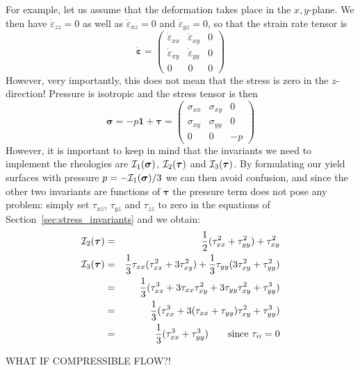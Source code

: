 For example, let us assume that the deformation takes place in the $x,y$-plane. 
We then have $\dot{\varepsilon}_{zz}=0$ as well as $\dot{\varepsilon}_{xz}=0$ and $\dot{\varepsilon}_{yz}=0$, so
that the strain rate tensor is 
\[
\dot{\bm \varepsilon}=
\left( \begin{array}{ccc}
\dot{\varepsilon}_{xx} & \dot{\varepsilon}_{xy} & 0 \\
\dot{\varepsilon}_{xy} & \dot{\varepsilon}_{yy} & 0 \\
0 & 0 & 0
\end{array}\right)
\]
However, very importantly, this does not mean that the stress is zero in the $z$-direction! Pressure is 
isotropic and the stress tensor is then 
\[
{\bm \sigma}=
-p {\bm 1} + {\bm \tau} =
\left( \begin{array}{ccc}
{\sigma}_{xx} & {\sigma}_{xy} & 0 \\
{\sigma}_{xy} & {\sigma}_{yy} & 0 \\
0 & 0 & -p
\end{array}\right)
\]
However, it is important to keep in mind that the invariants we need to implement 
the rheologies are ${\cal I}_1({\bm \sigma})$,  ${\cal I}_2({\bm \tau})$ and ${\cal I}_3({\bm \tau})$.
By formulating our yield surfaces with pressure $p=-{\cal I}_1({\bm \sigma})/3$ we can then 
avoid confusion, and since the other two invariants are functions of ${\bm \tau}$ the pressure 
term does not pose any problem: simply set $\tau_{xz}$, $\tau_{yz}$ and $\tau_{zz}$ to zero in the 
equations of Section~\ref{sec:stress_invariants} and we obtain:
\begin{eqnarray}
{\cal I}_2({\bm \tau}) &=&\frac{1}{2}(\tau_{xx}^2 + \tau_{yy}^2 ) + \tau_{xy}^2 \\ 
{\cal I}_3({\bm \tau}) 
&=& \frac{1}{3} \tau_{xx} (  \tau_{xx}^2 + 3 \tau_{xy}^2 ) 
+ \frac{1}{3} \tau_{yy} (3 \tau_{xy}^2 +   \tau_{yy}^2 )   \nonumber\\
&=& \frac{1}{3}(  \tau_{xx}^3 + 3 \tau_{xx}\tau_{xy}^2  
+ 3 \tau_{yy} \tau_{xy}^2 +   \tau_{yy}^3 )   \nonumber\\
&=& \frac{1}{3}(  \tau_{xx}^3 + 3 (\tau_{xx}+\tau_{yy}) \tau_{xy}^2  +  \tau_{yy}^3 )   \nonumber\\
&=& \frac{1}{3}(  \tau_{xx}^3 +  \tau_{yy}^3 )  \qquad \text{since } \tau_{ii}=0 
\end{eqnarray}

WHAT IF COMPRESSIBLE FLOW?!


\newpage
